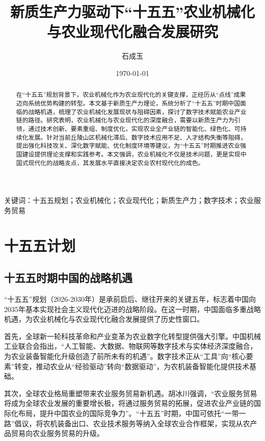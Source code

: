 \documentclass[12pt,fontset=windows]{ctexart}
\title{新质生产力驱动下“十五五”农业机械化与农业现代化融合发展研究}
\author{石成玉}
\date{\today}
\begin{document}
\maketitle

\articleTitle

\begin{abstract}
	在“十五五”规划背景下，农业机械化作为农业现代化的关键支撑，正经历从“点线”成果迈向系统优势构建的转型。本文基于新质生产力理论，系统分析了“十五五”时期中国面临的战略机遇，梳理了农业机械化发展现状与阻碍因素，探讨了数字技术赋能农业产业链的路径。研究表明，农业机械化与农业现代化的深度融合，需要以新质生产力为引领，通过技术创新、要素重组、制度优化，实现农业全产业链的智能化、绿色化、可持续化发展。针对当前丘陵山区机械化滞后、数字技术应用不足、人才结构失衡等阻碍，提出强化科技攻关、深化数字赋能、优化制度环境等建议，为“十五五”时期推进农业强国建设提供理论支撑和实践参考。本文强调，农业机械化不仅是技术问题，更是实现中国式现代化的战略支点，其发展水平直接决定农业农村现代化的成色。
\end{abstract}

关键词：十五五规划；农业机械化；农业现代化；新质生产力；数字技术；农业服务贸易

\section{十五五计划}

\subsection{十五五时期中国的战略机遇}

“十五五”规划（2026-2030年）是承前启后、继往开来的关键五年，标志着中国向2035年基本实现社会主义现代化迈进的战略阶段。在这一时期，中国面临多重战略机遇，为农业机械化与农业现代化融合发展提供了历史性窗口。

首先，全球新一轮科技革命和产业变革为农业数字化转型提供强大引擎。中国机械工业联合会指出，“人工智能、大数据、物联网等数字技术与实体经济深度融合，为农业装备智能化升级创造了前所未有的机遇”\cite{BenKanBianJiBuMaoDingShiWuWuAILingXinCheng2025YangGuoQiShuZhiHuaZhuanXingYuZhiNengZhiZaoLunTanZaiJingZhaoKai2025}。数字技术正从“工具”向“核心要素”转变，推动农业从“经验驱动”转向“数据驱动”，为农机装备智能化提供技术基础。

其次，全球农业格局重塑带来农业服务贸易新机遇。胡冰川强调，“农业服务贸易将成为全球农业发展的重要增长极，将通过服务贸易的拓展，促进农业产业链的国际化布局，提升中国农业的国际竞争力”\cite{HuBingChuanNongYeFuWuMaoYiYuQuanQiuNongYeGeJuChongSuShiWuWuShiQiZhongGuoDeZhanLueJiYu2025}。“十五五”时期，中国可依托“一带一路”倡议，将农机装备出口、农业技术服务等纳入全球农业合作框架，实现从农产品贸易向农业服务贸易的升级。
\end{document}
